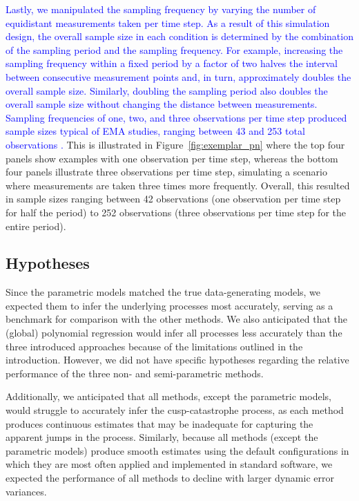\documentclass[man, floatsintext]{apa7}
\begin{document}
\textcolor{blue}{
  Lastly, we manipulated the sampling frequency by varying the number of
  equidistant measurements taken per time step. As a result of this simulation
  design, the overall sample size in each condition is determined by the
  combination of the sampling period and the sampling frequency. For example,
  increasing the sampling frequency within a fixed period by a factor of two
  halves the interval between consecutive measurement points and, in turn,
  approximately doubles the overall sample size. Similarly, doubling the
  sampling period also doubles the overall sample size without changing the
  distance between measurements. Sampling frequencies of one, two, and three
  observations per time step produced sample sizes typical of EMA studies,
  ranging between 43 and 253 total observations
  \parencite{wrzus_ecological_2023}.
} This is illustrated in
Figure~\ref{fig:exemplar_pn} where the top four panels show examples with one
observation per time step, whereas the bottom four panels illustrate three
observations per time step, simulating a scenario where measurements are taken
three times more frequently. Overall, this resulted in sample sizes ranging
between 42 observations (one observation per time step for half the period) to
252 observations (three observations per time step for the entire period).

\subsection{Hypotheses}

Since the parametric models matched the true data-generating models, we
expected them to infer the underlying processes most accurately, serving as a
benchmark for comparison with the other methods. We also anticipated that the
(global) polynomial regression would infer all processes less accurately than
the three introduced approaches because of the limitations outlined in the
introduction. However, we did not have specific hypotheses regarding the
relative performance of the three non- and semi-parametric methods.

Additionally, we anticipated that all methods, except the parametric models,
would struggle to accurately infer the cusp-catastrophe process, as each method
produces continuous estimates that may be inadequate for capturing the apparent
jumps in the process. Similarly, because all methods (except the parametric
models) produce smooth estimates using the default configurations in which they
are most often applied and implemented in standard software, we expected the
performance of all methods to decline with larger dynamic error variances.
\end{document}
